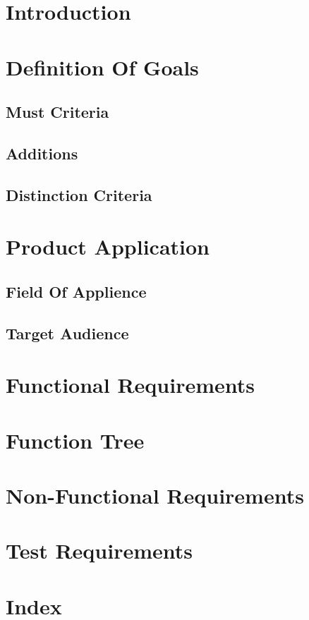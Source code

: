 \documentclass[10pt,a4paper,titlepage,twoside,english]{zhawreprt}
\begin{document}
\maketitle
\tableofcontents
\chapter{Introduction}\label{chp:Introduction}
\chapter{Definition Of Goals}\label{chp:DefinitionOfGoals}
\section{Must Criteria}\label{sec:MustCriteria}
\section{Additions}\label{sec:WishCriteria}
\section{Distinction Criteria}\label{sec:DistinctionCriteria}
\chapter{Product Application}\label{chp:ProductApplication}
\section{Field Of Applience}\label{sec:FieldOfApplience}
\section{Target Audience}\label{sec:TargetAudience}
\chapter{Functional Requirements}\label{chp:FunctionalRequirements}
\chapter{Function Tree}\label{chp:FunctionTree}
\chapter{Non-Functional Requirements}\label{chp:NonFunctionalRequirements}
\chapter{Test Requirements}\label{chp:TestRequirements}
\chapter{Index}\label{chp:Index}
\printglossary\label{sec:Glossary}
\newpage
\label{sec:Bibliography}
\end{document}
